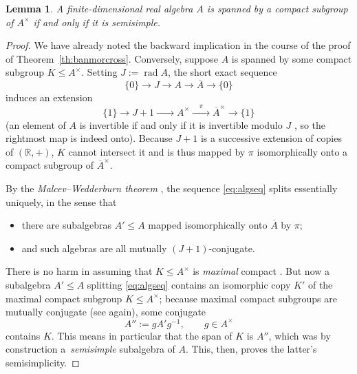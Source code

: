\documentclass[10pt,a4paper]{amsart}
\numberwithin{equation}{section}
\newtheorem{Lemma}[Theorem]{Lemma}
\newcommand\bR{{\mathbb R}}
\begin{document}
\begin{Lemma}\label{le:mustbess}
 A finite-dimensional real algebra $A$ is spanned by a compact subgroup of $A^{\times}$ if and only if it is semisimple.
\end{Lemma}
\begin{proof}
 We have already noted the backward implication in the course of the proof of Theorem~\ref{th:banmorcross}. Conversely, suppose $A$ is spanned by some compact subgroup $K\le A^{\times}$. Setting $J:=\operatorname{rad}A$, the short exact sequence
 \begin{equation}\label{eq:algseq}
 \{0\}\to J\xrightarrow{\quad}A\xrightarrow{\quad}\overline{A}\to \{0\}
 \end{equation}
 induces an extension
 \begin{equation*}
 \{1\}\to J+1\xrightarrow{\quad\phantom{\pi}\quad} A^{\times}\xrightarrow{\quad\pi\quad} \overline{A}^{\times}\to \{1\}
 \end{equation*}
 (an element of $A$ is invertible if and only if it is invertible modulo $J$ \cite[Proposition 4.8]{lam}, so the rightmost map is indeed onto). Because $J+1$ is a successive extension of copies of $(\bR,+)$, $K$ cannot intersect it and is thus mapped by $\pi$ isomorphically onto a compact subgroup of $\overline{A}^{\times}$.

 By the {\it Malcev--Wedderburn theorem} \cite[Section~11.6, Theorem]{pierce}, the sequence \eqref{eq:algseq} splits essentially uniquely, in the sense that
 \begin{itemize}\itemsep=0pt
 \item there are subalgebras $A'\le A$ mapped isomorphically onto $\overline{A}$ by $\pi$;
 \item and such algebras are all mutually $(J+1)$-conjugate.
 \end{itemize}
 There is no harm in assuming that $K\le A^{\times}$ is {\it maximal} compact \cite[Theorem~VII.1.2]{bor-symsp}. But now a subalgebra $A'\le A$ splitting \eqref{eq:algseq} contains an isomorphic copy $K'$ of the maximal compact subgroup $K\le A^{\times}$; because maximal compact subgroups are mutually conjugate (see \cite[Theorem~VII.1.2]{bor-symsp} again), some conjugate
 \begin{equation*}
 A'':=gA'g^{-1},\qquad g\in A^{\times}
 \end{equation*}
 contains $K$. This means in particular that the span of $K$ is $A''$, which was by construction a~{\it semisimple} subalgebra of $A$. This, then, proves the latter's semisimplicity.
\end{proof}
\end{document}
